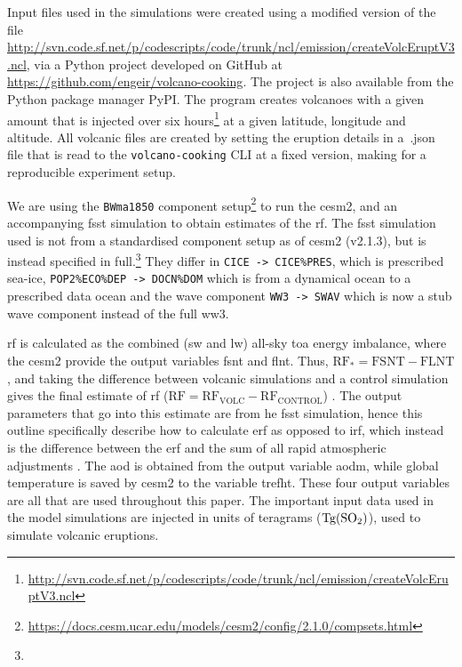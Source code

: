 \documentclass{ametsocV6.1}
\newcommand{\iso}[1][i]{{#1}njected \ce{SO2}}
\begin{document}


\appendix

\appendix[A]


Input files used in the simulations were created using a modified version of the file
\url{http://svn.code.sf.net/p/codescripts/code/trunk/ncl/emission/createVolcEruptV3.ncl},
via a Python project developed on GitHub at
\url{https://github.com/engeir/volcano-cooking}. The project is also available from the
Python package manager PyPI\@. The program creates volcanoes with a given 
amount that is injected over six
hours\footnote{\url{http://svn.code.sf.net/p/codescripts/code/trunk/ncl/emission/createVolcEruptV3.ncl}}
at a given latitude, longitude and altitude. All volcanic  files are created by
setting the eruption details in a~.json file that is read to the
\texttt{volcano-cooking} CLI at a fixed version, making for a reproducible experiment
setup.

We are using the \texttt{BWma1850} component
setup\footnote{\url{https://docs.cesm.ucar.edu/models/cesm2/config/2.1.0/compsets.html}}
to run the \gls{cesm2}, and an accompanying \gls{fsst} simulation to obtain estimates of
the \gls{rf}. The \gls{fsst} simulation used is not from a standardised component setup
as of \gls{cesm2} (v2.1.3), but is instead specified in full.\footnote{\fssturl} They
differ in \texttt{CICE -> CICE\%PRES}, which is prescribed sea-ice,
\texttt{POP2\%ECO\%DEP -> DOCN\%DOM} which is from a dynamical ocean to a prescribed
data ocean and the wave component \texttt{WW3 -> SWAV} which is now a stub wave
component instead of the full \gls{ww3}.

\gls{rf} is calculated as the combined (\gls{sw} and \gls{lw}) all-sky \gls{toa} energy
imbalance, where the \gls{cesm2} provide the output variables \gls{fsnt} and \gls{flnt}.
Thus, \(\mathrm{RF_*}= \mathrm{FSNT} - \mathrm{FLNT}\), and taking the difference
between volcanic simulations and a control simulation gives the final estimate of
\gls{rf} (\(\mathrm{RF}=\mathrm{RF_{VOLC}}-\mathrm{RF_{CONTROL}}\))
\citep{marshall2020}. The output parameters that go into this estimate are from he
\gls{fsst} simulation, hence this outline specifically describe how to calculate
\gls{erf} as opposed to \gls{irf}, which instead is the difference between the \gls{erf}
and the sum of all rapid atmospheric adjustments \citep{marshall2020,smith2018}. The
\gls{aod} is obtained from the output variable \gls{aodm}, while global temperature is
saved by \gls{cesm2} to the variable \gls{trefht}. These four output variables are all
that are used throughout this paper. The important input data used in the model
simulations are \iso{} in units of teragrams (\(\si{\tera\gram(\ce{SO2})}\)), used to
simulate volcanic eruptions.
\end{document}
